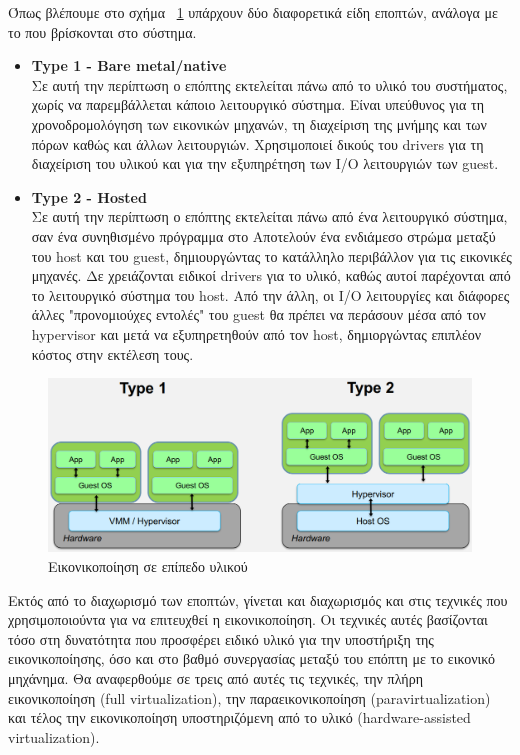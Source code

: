 Όπως βλέπουμε στο σχήμα ~\ref{fig3} υπάρχουν δύο διαφορετικά είδη εποπτών,
ανάλογα με το που βρίσκονται στο σύστημα. 
\begin{itemize}
	\item \textbf{Type 1 - Bare metal/native} \\
		Σε αυτή την περίπτωση ο επόπτης εκτελείται πάνω από το υλικό του
		συστήματος, χωρίς να παρεμβάλλεται κάποιο λειτουργικό σύστημα.
		Είναι υπεύθυνος για τη χρονοδρομολόγηση των εικονικών μηχανών,
		τη διαχείριση της μνήμης και των πόρων καθώς και άλλων
		λειτουργιών. Χρησιμοποιεί δικούς του drivers για τη διαχείριση
		του υλικού και για την εξυπηρέτηση των I/O λειτουργιών των
		guest. 
	\item \textbf{Type 2 - Hosted} \\
		Σε αυτή την περίπτωση ο επόπτης εκτελείται πάνω από ένα
		λειτουργικό σύστημα, σαν ένα συνηθισμένο πρόγραμμα στο
		 Αποτελούν ένα ενδιάμεσο στρώμα μεταξύ του host και
		του guest, δημιουργώντας το κατάλληλο περιβάλλον για τις
		εικονικές μηχανές. Δε χρειάζονται ειδικοί drivers για 
		το υλικό, καθώς αυτοί παρέχονται από το λειτουργικό σύστημα του
		host. Από την άλλη, οι I/O λειτουργίες και διάφορες άλλες
		"προνομιούχες εντολές" του guest θα πρέπει να
		περάσουν μέσα από τον hypervisor και μετά να εξυπηρετηθούν από
		τον host, δημιοργώντας επιπλέον κόστος στην εκτέλεση τους. 
\end{itemize}

\begin{figure}[htp]
\centering
	\includegraphics[scale=0.3]{figures/zcBClDR.png}
\caption{Εικονικοποίηση σε επίπεδο υλικού\label{fig3}}
\end{figure}

Εκτός από το διαχωρισμό των εποπτών, γίνεται και διαχωρισμός και στις τεχνικές
που χρησιμοποιούντα για να επιτευχθεί η εικονικοποίηση. Οι τεχνικές αυτές
βασίζονται τόσο στη δυνατότητα που προσφέρει ειδικό υλικό για την υποστήριξη της
εικονικοποίησης, όσο και στο βαθμό συνεργασίας μεταξύ του επόπτη με το εικονικό
μηχάνημα. Θα αναφερθούμε σε τρεις από αυτές τις τεχνικές, την πλήρη
εικονικοποίηση (full virtualization), την παραεικονικοποίηση
(paravirtualization) και τέλος την εικονικοποίηση υποστηριζόμενη από το υλικό
(hardware-assisted virtualization). 

